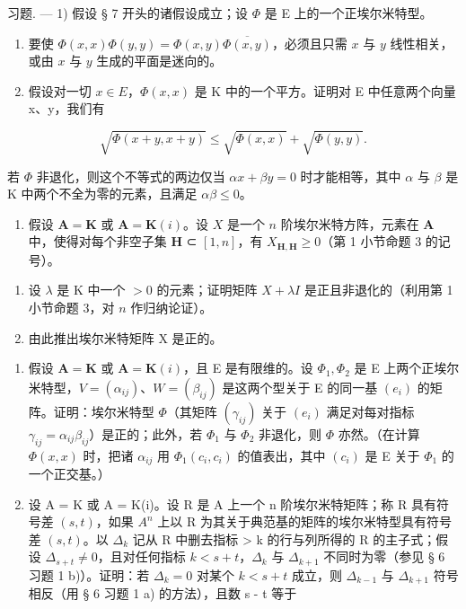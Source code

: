 习题. --- 1) 假设 § 7 开头的诸假设成立；设 \(\Phi\) 是 E 上的一个正埃尔米特型。

\begin{enumerate}
\def\labelenumi{\alph{enumi})}
\item
  要使 \(\Phi(x,x)\Phi(y,y)=\Phi(x,y)\overline{\Phi(x,y)}\)，必须且只需 \(x\) 与 \(y\) 线性相关，或由 \(x\) 与 \(y\) 生成的平面是迷向的。
\item
  假设对一切 \(x \in E\)，\(\Phi(x, x)\) 是 K 中的一个平方。证明对 E 中任意两个向量 x、y，我们有
\end{enumerate}

\[
\sqrt {\Phi (x + y , x + y)} \leqslant \sqrt {\Phi (x , x)} + \sqrt {\Phi (y , y)}.
\]

若 \(\Phi\) 非退化，则这个不等式的两边仅当 \(\alpha x + \beta y = 0\) 时才能相等，其中 \(\alpha\) 与 \(\beta\) 是 K 中两个不全为零的元素，且满足 \(\alpha \beta \leqslant 0\)。

\begin{enumerate}
\def\labelenumi{\arabic{enumi})}
\setcounter{enumi}{1}
\tightlist
\item
  假设 \(\mathbf{A} = \mathbf{K}\) 或 \(\mathbf{A} = \mathbf{K}(i)\)。设 \(X\) 是一个 \(n\) 阶埃尔米特方阵，元素在 \(\mathbf{A}\) 中，使得对每个非空子集 \(\mathbf{H}\) ⊂ \([1, n]\)，有 \(X_{\mathbf{H},\mathbf{H}} \geqslant 0\)（第 1 小节命题 3 的记号）。
\end{enumerate}

\begin{enumerate}
\def\labelenumi{\alph{enumi})}
\item
  设 \(\lambda\) 是 K 中一个 \(>0\) 的元素；证明矩阵 \(X + \lambda I\) 是正且非退化的（利用第 1 小节命题 3，对 \(n\) 作归纳论证）。
\item
  由此推出埃尔米特矩阵 X 是正的。
\end{enumerate}

\begin{enumerate}
\def\labelenumi{\arabic{enumi})}
\setcounter{enumi}{2}
\item
  假设 \(\mathbf{A} = \mathbf{K}\) 或 \(\mathbf{A} = \mathbf{K}(i)\)，且 E 是有限维的。设 \(\Phi_1, \Phi_2\) 是 E 上两个正埃尔米特型，\(V = (\alpha_{ij})\)、\(W = (\beta_{ij})\) 是这两个型关于 E 的同一基 \((e_i)\) 的矩阵。证明：埃尔米特型 \(\Phi\)（其矩阵 \((\gamma_{ij})\) 关于 \((e_i)\) 满足对每对指标 \(\gamma_{ij} = \alpha_{ij}\beta_{ij}\)）是正的；此外，若 \(\Phi_1\) 与 \(\Phi_2\) 非退化，则 \(\Phi\) 亦然。（在计算 \(\Phi(x, x)\) 时，把诸 \(\alpha_{ij}\) 用 \(\Phi_1(c_i, c_i)\) 的值表出，其中 \((c_i)\) 是 E 关于 \(\Phi_1\) 的一个正交基。）
\item
  设 A = K 或 A = K(i)。设 R 是 A 上一个 n 阶埃尔米特矩阵；称 R 具有符号差 \((s, t)\)，如果 \(A^{n}\) 上以 R 为其关于典范基的矩阵的埃尔米特型具有符号差 \((s, t)\)。以 \(\Delta_{k}\) 记从 R 中删去指标 \textgreater{} k 的行与列所得的 R 的主子式；假设 \(\Delta_{s+t} \neq 0\)，且对任何指标 \(k < s + t\)，\(\Delta_{k}\) 与 \(\Delta_{k+1}\) 不同时为零（参见 § 6 习题 1 b)）。证明：若 \(\Delta_{k} = 0\) 对某个 \(k < s + t\) 成立，则 \(\Delta_{k-1}\) 与 \(\Delta_{k+1}\) 符号相反（用 § 6 习题 1 a) 的方法），且数 s - t 等于
\end{enumerate}

